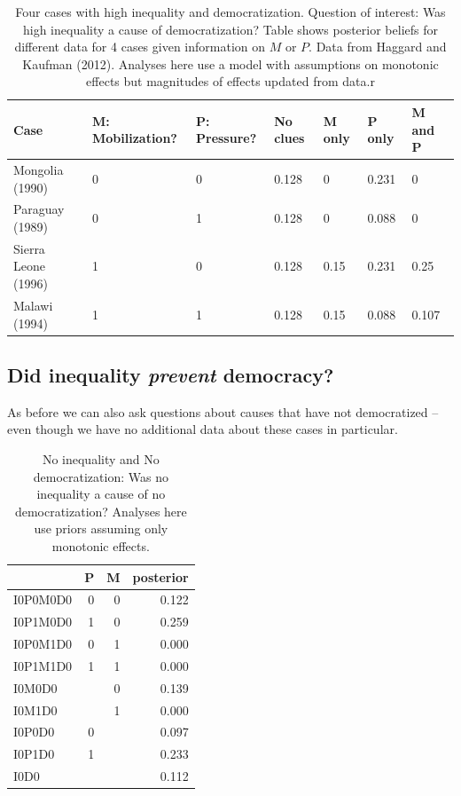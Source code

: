 \documentclass[
  12pt,
]{book}
\begin{document}
\begin{table}

\caption{\label{tab:HK10cases2}Four cases with high inequality and  democratization. Question of interest: Was high inequality a cause of democratization? Table shows posterior beliefs for different data for 4 cases given information on $M$ or $P$. Data from Haggard and Kaufman (2012).  Analyses here use a model with assumptions on monotonic effects but magnitudes of effects updated from data.r}
\centering
\begin{tabular}[t]{l|l|l|l|l|l|l}
\hline
Case & M: Mobilization? & P: Pressure? & No clues & M only & P only & M and P\\
\hline
Mongolia (1990) & 0 & 0 & 0.128 & 0 & 0.231 & 0\\
\hline
Paraguay (1989) & 0 & 1 & 0.128 & 0 & 0.088 & 0\\
\hline
Sierra Leone (1996) & 1 & 0 & 0.128 & 0.15 & 0.231 & 0.25\\
\hline
Malawi (1994) & 1 & 1 & 0.128 & 0.15 & 0.088 & 0.107\\
\hline
\end{tabular}
\end{table}

\hypertarget{did-inequality-prevent-democracy}{%
\subsection{\texorpdfstring{Did inequality \emph{prevent} democracy?}{Did inequality prevent democracy?}}\label{did-inequality-prevent-democracy}}

As before we can also ask questions about causes that have not democratized -- even though we have no additional data about these cases in particular.

\begin{table}

\caption{\label{tab:Tapp101}No inequality and No democratization: Was no inequality a cause of no democratization? Analyses here use priors assuming only monotonic effects.}
\centering
\begin{tabular}[t]{l|r|r|r}
\hline
  & P & M & posterior\\
\hline
I0P0M0D0 & 0 & 0 & 0.122\\
\hline
I0P1M0D0 & 1 & 0 & 0.259\\
\hline
I0P0M1D0 & 0 & 1 & 0.000\\
\hline
I0P1M1D0 & 1 & 1 & 0.000\\
\hline
I0M0D0 &  & 0 & 0.139\\
\hline
I0M1D0 &  & 1 & 0.000\\
\hline
I0P0D0 & 0 &  & 0.097\\
\hline
I0P1D0 & 1 &  & 0.233\\
\hline
I0D0 &  &  & 0.112\\
\hline
\end{tabular}
\end{table}
\end{document}
